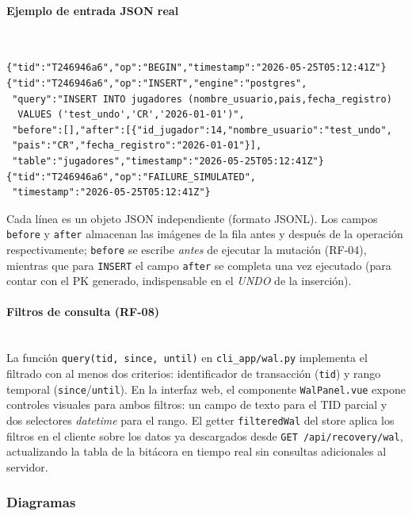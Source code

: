 \documentclass[12pt,letterpaper]{article}
\begin{document}
\paragraph{Ejemplo de entrada JSON real}\mbox{}\\

\begin{lstlisting}[style=jsoncode, caption={Entradas reales del WAL — BEGIN e INSERT en \texttt{.dbclient/wal.jsonl}}]
{"tid":"T246946a6","op":"BEGIN","timestamp":"2026-05-25T05:12:41Z"}
{"tid":"T246946a6","op":"INSERT","engine":"postgres",
 "query":"INSERT INTO jugadores (nombre_usuario,pais,fecha_registro)
  VALUES ('test_undo','CR','2026-01-01')",
 "before":[],"after":[{"id_jugador":14,"nombre_usuario":"test_undo",
 "pais":"CR","fecha_registro":"2026-01-01"}],
 "table":"jugadores","timestamp":"2026-05-25T05:12:41Z"}
{"tid":"T246946a6","op":"FAILURE_SIMULATED",
 "timestamp":"2026-05-25T05:12:41Z"}
\end{lstlisting}

Cada línea es un objeto JSON independiente (formato JSONL). Los campos
\texttt{before} y \texttt{after} almacenan las imágenes de la fila antes y después
de la operación respectivamente; \texttt{before} se escribe \emph{antes} de ejecutar
la mutación (RF-04), mientras que para \texttt{INSERT} el campo \texttt{after} se
completa una vez ejecutado (para contar con el PK generado, indispensable en el
\textit{UNDO} de la inserción).

\paragraph{Filtros de consulta (RF-08)}\mbox{}\\

La función \texttt{query(tid, since, until)} en \texttt{cli\_app/wal.py} implementa
el filtrado con al menos dos criterios: identificador de transacción (\texttt{tid}) y
rango temporal (\texttt{since}/\texttt{until}). En la interfaz web, el componente
\texttt{WalPanel.vue} expone controles visuales para ambos filtros: un campo de texto
para el TID parcial y dos selectores \textit{datetime} para el rango. El getter
\texttt{filteredWal} del store aplica los filtros en el cliente sobre los datos ya
descargados desde \texttt{GET /api/recovery/wal}, actualizando la tabla de la
bitácora en tiempo real sin consultas adicionales al servidor.

\subsubsection{Diagramas}
\end{document}
